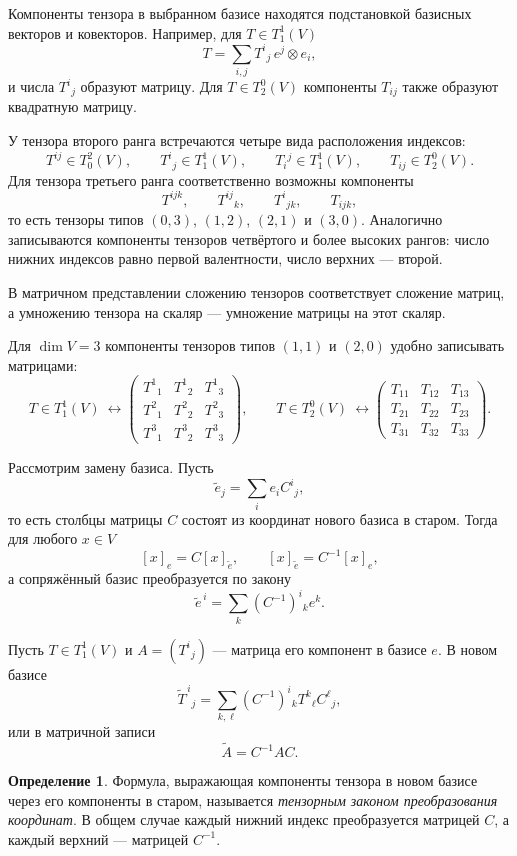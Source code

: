 \documentclass[12pt,a4paper,oneside,openany]{book}
\theoremstyle{definition}
\newtheorem{definition}{Определение}[chapter]
\theoremstyle{plain}
\theoremstyle{remark}
\begin{document}
Компоненты тензора в выбранном базисе находятся подстановкой базисных
векторов и ковекторов. Например, для $T\in T_1^1(V)$
\[
  T=\sum_{i,j}T^i{}_j\,e^j\otimes e_i,
\]
и числа $T^i{}_j$ образуют матрицу. Для $T\in T_2^0(V)$ компоненты
$T_{ij}$ также образуют квадратную матрицу.


У тензора второго ранга встречаются четыре вида расположения индексов:
\[
  T^{ij}\in T_0^2(V),\qquad
  T^i{}_j\in T_1^1(V),\qquad
  T_i{}^j\in T_1^1(V),\qquad
  T_{ij}\in T_2^0(V).
\]
Для тензора третьего ранга соответственно возможны компоненты
\[
  T^{ijk},\qquad T^{ij}{}_k,\qquad
  T^i{}_{jk},\qquad T_{ijk},
\]
то есть тензоры типов $(0,3)$, $(1,2)$, $(2,1)$ и $(3,0)$.
Аналогично записываются компоненты тензоров четвёртого и более высоких
рангов: число нижних индексов равно первой валентности, число верхних ---
второй.

В матричном представлении сложению тензоров соответствует сложение
матриц, а умножению тензора на скаляр --- умножение матрицы на этот
скаляр.

Для $\dim V=3$ компоненты тензоров типов $(1,1)$ и $(2,0)$ удобно
записывать матрицами:
\[
  T\in T_1^1(V)\ \longleftrightarrow
  \begin{pmatrix}
    T^1{}_1&T^1{}_2&T^1{}_3\\
    T^2{}_1&T^2{}_2&T^2{}_3\\
    T^3{}_1&T^3{}_2&T^3{}_3
  \end{pmatrix},
  \qquad
  T\in T_2^0(V)\ \longleftrightarrow
  \begin{pmatrix}
    T_{11}&T_{12}&T_{13}\\
    T_{21}&T_{22}&T_{23}\\
    T_{31}&T_{32}&T_{33}
  \end{pmatrix}.
\]

Рассмотрим замену базиса. Пусть
\[
  \widetilde e_j=\sum_i e_i C^i{}_j,
\]
то есть столбцы матрицы $C$ состоят из координат нового базиса в старом.
Тогда для любого $x\in V$
\[
  [x]_e=C[x]_{\widetilde e},
  \qquad
  [x]_{\widetilde e}=C^{-1}[x]_e,
\]
а сопряжённый базис преобразуется по закону
\[
  \widetilde e^{\,i}=\sum_k(C^{-1})^i{}_k e^k.
\]


Пусть $T\in T_1^1(V)$ и $A=(T^i{}_j)$ --- матрица его компонент в
базисе $e$. В новом базисе
\[
  \widetilde T^{\,i}{}_{j}
  =\sum_{k,\ell}(C^{-1})^i{}_k T^k{}_{\ell}C^{\ell}{}_j,
\]
или в матричной записи
\[
  \widetilde A=C^{-1}AC.
\]

\begin{definition}
Формула, выражающая компоненты тензора в новом базисе через его
компоненты в старом, называется \emph{тензорным законом преобразования
координат}. В общем случае каждый нижний индекс преобразуется матрицей
$C$, а каждый верхний --- матрицей $C^{-1}$.
\end{definition}
\end{document}
